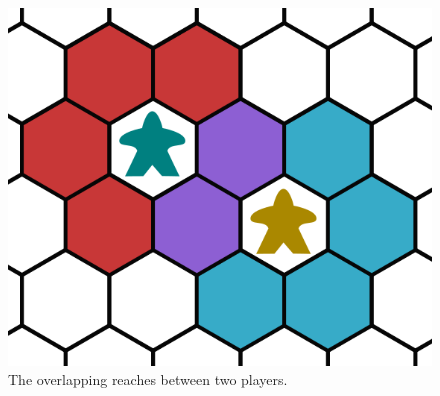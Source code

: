 \begin{figure}
    \centering
    \includegraphics{graphics/tackle-zones-2.png}
    \caption{The overlapping reaches between two players.}
    \label{fig:tackle-zone-2}
\end{figure}